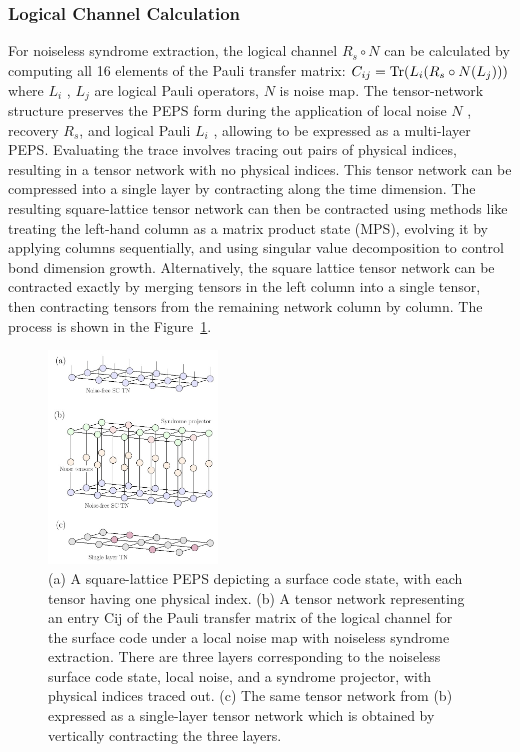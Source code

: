 \subsubsection{Logical Channel Calculation}

For noiseless syndrome extraction, the logical channel $R_s \circ N$ can be calculated by computing all 16 elements of the Pauli transfer matrix: $C_{ij} = {\rm Tr}(L_i(R_s\circ N(L_j)))$
where $L_i$ , $L_j$ are logical Pauli operators, $N$ is noise map. The tensor-network structure preserves the PEPS form during the application of local noise $N$ , recovery  $R_s$, and logical Pauli $L_i$ , allowing  to be expressed as a multi-layer PEPS. Evaluating the trace involves tracing out pairs of physical indices, resulting in a tensor network with no physical indices. This tensor network can be compressed into a single layer by contracting along the time dimension. The resulting square-lattice tensor network can then be contracted using methods like treating the left-hand column as a matrix product state (MPS), evolving it by applying columns sequentially, and using singular value decomposition to control bond dimension growth. Alternatively, the square lattice tensor network can be contracted exactly by merging tensors in the left column into a single tensor, then contracting tensors from the remaining network column by column. The process is shown in the Figure~\ref{fig:TN_layout}.

\begin{figure}[h]
    \centering
    \includegraphics[width=0.4\textwidth]{sections/3_decoder/TN_layout.jpg}
    \caption{(a) A square-lattice PEPS depicting a surface code state, with each tensor having one physical index. (b) A tensor network representing an entry Cij of the Pauli transfer matrix of the logical channel for the surface code under a local noise map with noiseless syndrome extraction. There are three layers corresponding to the noiseless surface code state, local noise, and a syndrome projector, with physical indices traced out. (c) The same tensor network from (b) expressed as a single-layer tensor network which is obtained by vertically contracting the three layers.}
    \label{fig:TN_layout}
\end{figure}

